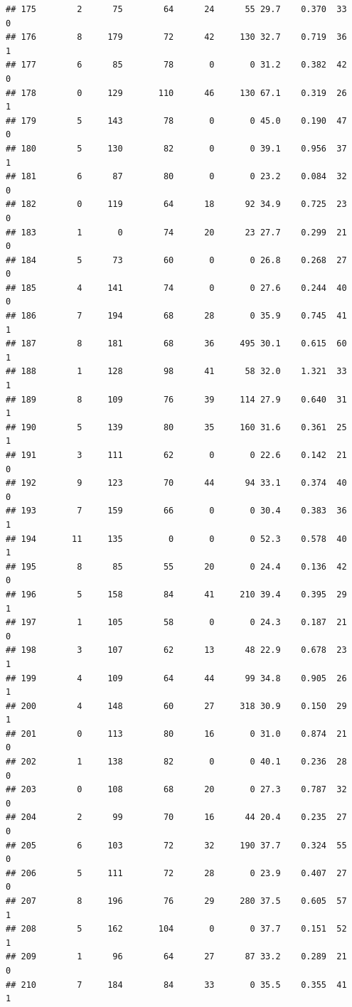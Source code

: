 \documentclass[11pt, a4paper]{article}\usepackage[]{graphicx}\usepackage[]{xcolor}
\makeatletter
\newenvironment{kframe}{%
 \def\at@end@of@kframe{}%
 \ifinner\ifhmode%
  \def\at@end@of@kframe{\end{minipage}}%
  \begin{minipage}{\columnwidth}%
 \fi\fi%
 \def\FrameCommand##1{\hskip\@totalleftmargin \hskip-\fboxsep
 \colorbox{shadecolor}{##1}\hskip-\fboxsep
     \hskip-\linewidth \hskip-\@totalleftmargin \hskip\columnwidth}%
 \MakeFramed {\advance\hsize-\width
   \@totalleftmargin\z@ \linewidth\hsize
   \@setminipage}}%
 {\par\unskip\endMakeFramed%
 \at@end@of@kframe}
\newenvironment{knitrout}{}{} %
\makeatother
\begin{document}
\begin{knitrout}
\begin{kframe}
\begin{verbatim}
## 175        2      75        64      24      55 29.7    0.370  33    0
## 176        8     179        72      42     130 32.7    0.719  36    1
## 177        6      85        78       0       0 31.2    0.382  42    0
## 178        0     129       110      46     130 67.1    0.319  26    1
## 179        5     143        78       0       0 45.0    0.190  47    0
## 180        5     130        82       0       0 39.1    0.956  37    1
## 181        6      87        80       0       0 23.2    0.084  32    0
## 182        0     119        64      18      92 34.9    0.725  23    0
## 183        1       0        74      20      23 27.7    0.299  21    0
## 184        5      73        60       0       0 26.8    0.268  27    0
## 185        4     141        74       0       0 27.6    0.244  40    0
## 186        7     194        68      28       0 35.9    0.745  41    1
## 187        8     181        68      36     495 30.1    0.615  60    1
## 188        1     128        98      41      58 32.0    1.321  33    1
## 189        8     109        76      39     114 27.9    0.640  31    1
## 190        5     139        80      35     160 31.6    0.361  25    1
## 191        3     111        62       0       0 22.6    0.142  21    0
## 192        9     123        70      44      94 33.1    0.374  40    0
## 193        7     159        66       0       0 30.4    0.383  36    1
## 194       11     135         0       0       0 52.3    0.578  40    1
## 195        8      85        55      20       0 24.4    0.136  42    0
## 196        5     158        84      41     210 39.4    0.395  29    1
## 197        1     105        58       0       0 24.3    0.187  21    0
## 198        3     107        62      13      48 22.9    0.678  23    1
## 199        4     109        64      44      99 34.8    0.905  26    1
## 200        4     148        60      27     318 30.9    0.150  29    1
## 201        0     113        80      16       0 31.0    0.874  21    0
## 202        1     138        82       0       0 40.1    0.236  28    0
## 203        0     108        68      20       0 27.3    0.787  32    0
## 204        2      99        70      16      44 20.4    0.235  27    0
## 205        6     103        72      32     190 37.7    0.324  55    0
## 206        5     111        72      28       0 23.9    0.407  27    0
## 207        8     196        76      29     280 37.5    0.605  57    1
## 208        5     162       104       0       0 37.7    0.151  52    1
## 209        1      96        64      27      87 33.2    0.289  21    0
## 210        7     184        84      33       0 35.5    0.355  41    1

\end{verbatim}
\end{kframe}
\end{knitrout}
\end{document}
